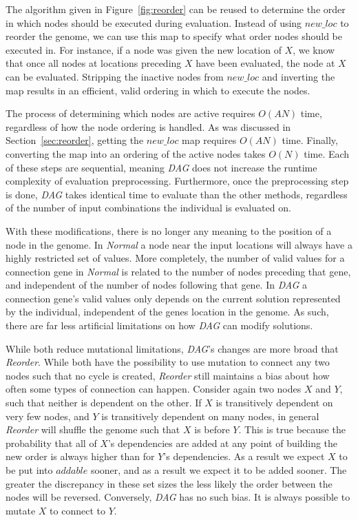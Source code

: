 \documentclass[journal]{IEEEtran}
\begin{document}
The algorithm given in Figure~\ref{fig:reorder} can be reused to determine the order
in which nodes should be executed during evaluation.  Instead of using $new\_loc$
to reorder the genome, we can use this map to specify what order nodes should be
executed in.  For instance, if a node was given the new location of $X$, we know
that once all nodes at locations preceding $X$ have been evaluated, the node at $X$
can be evaluated.  Stripping the inactive nodes from $new\_loc$ and inverting the map
results in an efficient, valid ordering in which to execute the nodes.

The process of determining which nodes are active requires $O(AN)$ time, regardless
of how the node ordering is handled.  As was discussed in Section~\ref{sec:reorder},
getting the $new\_loc$ map requires $O(AN)$ time.  Finally, converting the map
into an ordering of the active nodes takes $O(N)$ time.  Each of these steps are
sequential, meaning \emph{DAG} does not increase the runtime complexity of evaluation
preprocessing.  Furthermore, once the preprocessing step is done, \emph{DAG} takes
identical time to evaluate than the other methods, regardless of the number of
input combinations the individual is evaluated on.

With these modifications, there is no longer any meaning to the position of a node
in the genome.  In \emph{Normal} a node near the input locations will always
have a highly restricted set of values.  More completely, the number of valid
values for a connection gene in \emph{Normal} is related to the number of nodes
preceding that gene, and independent of the number of nodes following that gene.
In \emph{DAG} a connection gene's valid values only depends on the current solution
represented by the individual, independent of the genes location in the genome.
As such, there are far less artificial limitations on how \emph{DAG} can modify
solutions.

While both reduce mutational limitations, \emph{DAG}'s changes are more broad that
\emph{Reorder}.  While both have the possibility to use mutation to connect any two
nodes such that no cycle is created, \emph{Reorder} still maintains a bias about
how often some types of connection can happen.  Consider again two nodes $X$ and $Y$,
such that neither is dependent on the other.  If $X$ is transitively dependent on very
few nodes, and $Y$ is transitively dependent on many nodes, in general \emph{Reorder}
will shuffle the genome such that $X$ is before $Y$.  This is true because the probability
that all of $X$'s dependencies are added at any point of building the new order is always
higher than for $Y$'s dependencies.  As a result we expect $X$ to be put into $addable$ sooner,
and as a result we expect it to be added sooner.  The greater the discrepancy in these
set sizes the less likely the order between the nodes will be reversed.
Conversely, \emph{DAG} has no such bias.  It is always possible to mutate $X$ to connect to $Y$.
\end{document}
